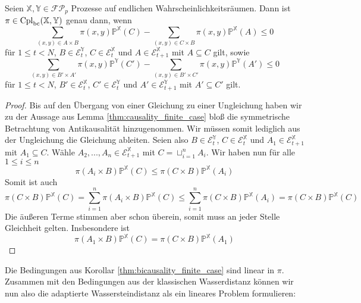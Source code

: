 \begin{corollary}
Seien $\mathbb{X,Y} \in \mathcal{FP}_p$ Prozesse auf endlichen Wahrscheinlichkeitsräumen. Dann ist $\pi \in \operatorname{Cpl}_{\operatorname{bc}}(\mathbb{X,Y})$ genau dann, wenn
$$\sum_{(x,y) \in A \times B} \pi(x,y) \mathbb{P}^\mathbb{X}(C) - \sum_{(x,y) \in C \times B} \pi(x,y) \mathbb{P}^\mathbb{X}(A)\leq 0$$
für $1\leq t < N$, $B \in \mathcal{E}_t^\mathbb{Y}$, $C \in \mathcal{E}_t^\mathbb{X}$ und $A \in \mathcal{E}_{t+1}^\mathbb{X}$ mit $A\subseteq C$ gilt, sowie
$$\sum_{(x,y) \in B' \times A'} \pi(x,y) \mathbb{P}^\mathbb{Y}(C') - \sum_{(x,y) \in B' \times C'} \pi(x,y) \mathbb{P}^\mathbb{Y}(A') \leq 0$$
für $1\leq t<N$, $B' \in \mathcal{E}_t^\mathbb{X}$, $C' \in \mathcal{E}_t^\mathbb{Y}$ und $A' \in \mathcal{E}_{t+1}^\mathbb{Y}$ mit $A'\subseteq C'$ gilt.
\end{corollary}\label{thm:bicausality_finite_case}
\begin{proof}
    Bis auf den Übergang von einer Gleichung zu einer Ungleichung haben wir zu der Aussage aus Lemma \ref{thm:causality_finite_case} bloß die symmetrische Betrachtung von Antikausalität hinzugenommen. Wir müssen somit lediglich aus der Ungleichung die Gleichung ableiten. Seien also $B \in \mathcal{E}_t^\mathbb{Y}$, $C \in \mathcal{E}_t^\mathbb{X}$ und $A_1\in \mathcal{E}_{t+1}^\mathbb{X}$ mit $A_1 \subseteq C$. Wähle $A_2,...,A_n \in \mathcal{E}_{t+1}^\mathbb{X}$ mit $C = \sqcup_{i=1}^n A_i$. Wir haben nun für alle $1\leq i\leq n$
    $$\pi(A_i \times B) \mathbb{P}^\mathbb{X}(C) \leq \pi(C \times B) \mathbb{P}^\mathbb{X}(A_i)$$
    Somit ist auch 
    $$\pi(C\times B) \mathbb{P}^\mathbb{X}(C) = \sum_{i=1}^n \pi(A_i\times B) \mathbb{P}^\mathbb{X}(C) \leq \sum_{i=1}^n\pi(C\times B)\mathbb{P}^\mathbb{X}(A_i) = \pi(C\times B) \mathbb{P}^\mathbb{X}(C)$$
    Die äußeren Terme stimmen aber schon überein, somit muss an jeder Stelle Gleichheit gelten. Insbesondere ist 
    $$\pi(A_1 \times B) \mathbb{P}^\mathbb{X}(C) = \pi(C\times B) \mathbb{P}^\mathbb{X}(A_1)$$
\end{proof}

Die Bedingungen aus Korollar \ref{thm:bicausality_finite_case} sind linear in $\pi$. Zusammen mit den Bedingungen aus der klassischen Wasserdistanz können wir nun also die adaptierte Wassersteindistanz als ein lineares Problem formulieren: 

